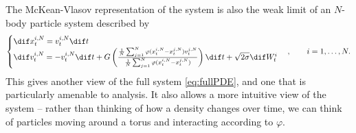 \documentclass[11pt, a4paper, draft]{article}
\renewcommand{\phi}{\varphi}
\begin{document}
        The McKean-Vlasov representation of the system is also the weak limit of an $N$-body particle system described by
        \begin{equation}\label{eq:full_particle}\begin{cases}
            \dif x^{i,N}_t = v^{i,N}_t\dif t\\
            \dif v^{i,N}_t = -v^{i,N}_t\dif t + G\left(\frac{\frac{1}{N}\sum_{j=1}^N \phi(x_t^{i,N} - x_t^{j,N})v^{j,N}_t  }{\frac{1}{N}\sum_{j=1}^N \phi(x_t^{i,N} - x_t^{j,N})}\right)\dif t + \sqrt{2\sigma} \dif W^i_t 
            \end{cases}, \qquad  i = 1,\dots,N.
        \end{equation}
        This gives another view of the full system \eqref{eq:fullPDE}, and one that is particularly amenable to analysis. It also allows a more intuitive view of the system -- rather than thinking of how a density changes over time, we can think of particles moving around a torus and interacting according to $\phi$.
        
\end{document}

